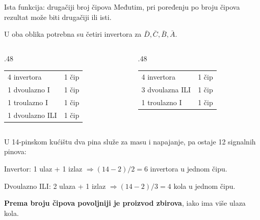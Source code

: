 \begin{frame}[label=02-s046]{Ista funkcija: drugačiji broj čipova}
\setlength{\parskip}{0pt}
\renewcommand{\arraystretch}{1.0}
Međutim, pri poređenju po broju čipova rezultat može biti drugačiji ili isti.
\par\vspace{1.5mm}
U oba oblika potrebna su četiri invertora za \(\bar D,\bar C,\bar B,\bar A\).
\par\vspace{1.5mm}
\begin{columns}[T,onlytextwidth]
\begin{column}{.48\textwidth}
\par\vspace{1.5mm}
\begin{tabular}{@{}ll@{}}
4 invertora & 1 čip \\
1 dvoulazno I & 1 čip \\
1 troulazno I & 1 čip \\
1 dvoulazno ILI & 1 čip \\
\end{tabular}

\end{column}
\begin{column}{.48\textwidth}
\par\vspace{1.5mm}
\begin{tabular}{@{}ll@{}}
4 invertora & 1 čip \\
3 dvoulazna ILI & 1 čip \\
1 troulazno I & 1 čip \\
\end{tabular}

\end{column}
\end{columns}
\par\vspace{1.5mm}
U 14-pinskom kućištu dva pina služe za masu i napajanje, pa ostaje 12 signalnih pinova:
\par
Invertor: 1 ulaz + 1 izlaz \(\Rightarrow (14-2)/2=6\) invertora u jednom čipu.
\par
Dvoulazno ILI: 2 ulaza + 1 izlaz \(\Rightarrow (14-2)/3=4\) kola u jednom čipu.
\par\vspace{1.5mm}
\alert{\textbf{Prema broju čipova povoljniji je proizvod zbirova}}, iako ima više ulaza kola.
\end{frame}
